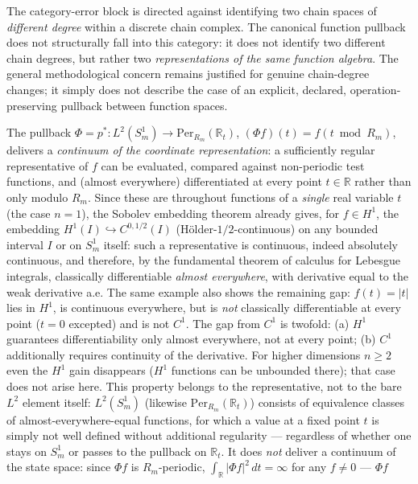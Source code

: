 The category-error block is directed against identifying two chain spaces
of \emph{different degree} within a discrete chain complex. The canonical
function pullback does not structurally fall into this category: it does
not identify two different chain degrees, but rather two
\emph{representations of the same function algebra}. The general
methodological concern remains justified for genuine chain-degree
changes; it simply does not describe the case of an explicit, declared,
operation-preserving pullback between function spaces.

\begin{kernbox}[title={Refinement: two different meanings of ``continuum''}]
The pullback $\Phi=p^*:L^2(S^1_m)\to\mathrm{Per}_{R_m}(\mathbb{R}_t)$,
$(\Phi f)(t)=f(t\bmod R_m)$, delivers a \emph{continuum of the coordinate
representation}: a sufficiently regular representative of $f$ can be
evaluated, compared against non-periodic test functions, and (almost
everywhere) differentiated at every point $t\in\mathbb{R}$ rather than
only modulo $R_m$. Since these are throughout functions of a
\emph{single} real variable $t$ (the case $n=1$), the Sobolev embedding
theorem already gives, for $f\in H^1$, the embedding
$H^1(I)\hookrightarrow C^{0,1/2}(I)$ (Hölder-$1/2$-continuous) on any
bounded interval $I$ or on $S^1_m$ itself: such a representative is
continuous, indeed absolutely continuous, and therefore, by the
fundamental theorem of calculus for Lebesgue integrals, classically
differentiable \emph{almost everywhere}, with derivative equal to the
weak derivative a.e. The same example also shows the remaining gap:
$f(t)=|t|$ lies in $H^1$, is continuous everywhere, but is \emph{not}
classically differentiable at every point ($t=0$ excepted) and is not
$C^1$. The gap from $C^1$ is twofold: (a) $H^1$ guarantees
differentiability only almost everywhere, not at every point; (b) $C^1$
additionally requires continuity of the derivative.
For higher dimensions $n\geq2$ even the $H^1$ gain disappears ($H^1$
functions can be unbounded there); that case does not arise here. This
property belongs to the representative, not to the bare $L^2$ element
itself: $L^2(S^1_m)$
(likewise $\mathrm{Per}_{R_m}(\mathbb{R}_t)$) consists of equivalence
classes of almost-everywhere-equal functions, for which a value at a
fixed point $t$ is simply not well defined without additional
regularity --- regardless of whether one stays on $S^1_m$ or passes to
the pullback on $\mathbb{R}_t$. It does \emph{not} deliver a continuum of
the state space: since $\Phi f$ is $R_m$-periodic,
$\int_{\mathbb{R}}|\Phi f|^2\,dt=\infty$ for any $f\neq0$ --- $\Phi f$

\end{kernbox}
